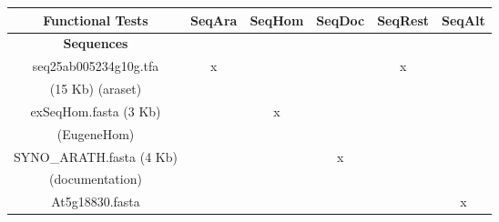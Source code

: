 \documentclass[a4paper,11pt]{article}
\begin{document}
\begin{center}
\begin{tabular}{|c|c|c|c|c|c|} \hline \hline
{\bf Functional Tests}& {\bf SeqAra}& {\bf SeqHom}& {\bf SeqDoc}& {\bf SeqRest}& {\bf SeqAlt}\\ \hline \hline

{\bf Sequences}& & & & & \\ \hline \hline
seq25ab005234g10g.tfa    & x &   &   & x &    \\
(15 Kb) (araset)         &   &   &   &   &    \\ \hline 
exSeqHom.fasta (3 Kb)    &   & x &   &   &     \\ 
(EugeneHom)              &   &   &   &   &    \\ \hline 
SYNO\_ARATH.fasta (4 Kb) &   &   & x &   &     \\ 
(documentation)          &   &   &   &   &    \\ \hline 
 At5g18830.fasta         &   &   &   &   & x  \\ \hline \hline 


\end{tabular}
\end{center}
\end{document}
